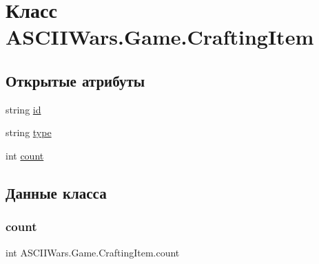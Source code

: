 \hypertarget{class_a_s_c_i_i_wars_1_1_game_1_1_crafting_item}{}\section{Класс A\+S\+C\+I\+I\+Wars.\+Game.\+Crafting\+Item}
\label{class_a_s_c_i_i_wars_1_1_game_1_1_crafting_item}
\subsection*{Открытые атрибуты}
\begin{DoxyCompactItemize}
\item 
string \hyperlink{class_a_s_c_i_i_wars_1_1_game_1_1_crafting_item_a053928c27417f2ff248fae79f1e5adc3}{id}
\item 
string \hyperlink{class_a_s_c_i_i_wars_1_1_game_1_1_crafting_item_a18242bdb01042b4a85c92fdb3bff0d05}{type}
\item 
int \hyperlink{class_a_s_c_i_i_wars_1_1_game_1_1_crafting_item_af27ae0339fb398e1e2a8d554c7909630}{count}
\end{DoxyCompactItemize}


\subsection{Данные класса}
\hypertarget{class_a_s_c_i_i_wars_1_1_game_1_1_crafting_item_af27ae0339fb398e1e2a8d554c7909630}{}\label{class_a_s_c_i_i_wars_1_1_game_1_1_crafting_item_af27ae0339fb398e1e2a8d554c7909630} 
\subsubsection{\texorpdfstring{count}{count}}
{\footnotesize\ttfamily int A\+S\+C\+I\+I\+Wars.\+Game.\+Crafting\+Item.\+count}

\hypertarget{class_a_s_c_i_i_wars_1_1_game_1_1_crafting_item_a053928c27417f2ff248fae79f1e5adc3}{}\label{class_a_s_c_i_i_wars_1_1_game_1_1_crafting_item_a053928c27417f2ff248fae79f1e5adc3} 
